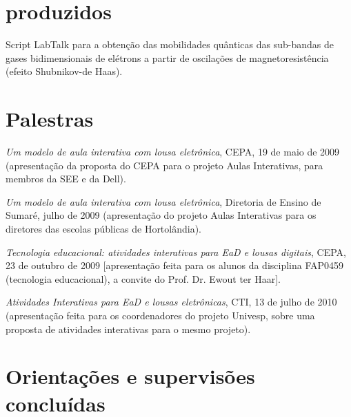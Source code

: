 \section*{ produzidos}

\begin{compactitem}
	\item Script LabTalk para a obtenção das mobilidades quânticas das sub-bandas de gases bidimensionais de elétrons a partir de oscilações de magnetoresistência (efeito Shubnikov-de Haas).
\end{compactitem}

\section*{Palestras}

\begin{compactitem}
	\item \textsl{Um modelo de aula interativa com lousa eletrônica}, CEPA, 19 de maio de 2009 (apresentação da proposta do CEPA para o projeto Aulas Interativas, para membros da SEE e da Dell).
	\item \textsl{Um modelo de aula interativa com lousa eletrônica}, Diretoria de Ensino de Sumaré, julho de 2009 (apresentação do projeto Aulas Interativas para os diretores das escolas públicas de Hortolândia).
	\item \textsl{Tecnologia educacional: atividades interativas para EaD e lousas digitais}, CEPA, 23 de outubro de 2009 [apresentação feita para os alunos da disciplina FAP0459 (tecnologia educacional), a convite do Prof. Dr. Ewout ter Haar].
	\item \textsl{Atividades Interativas para EaD e lousas eletrônicas}, CTI, 13 de julho de 2010 (apresentação feita para os coordenadores do projeto Univesp, sobre uma proposta de atividades interativas para o mesmo projeto).
\end{compactitem}

\section*{Orientações e supervisões concluídas}

